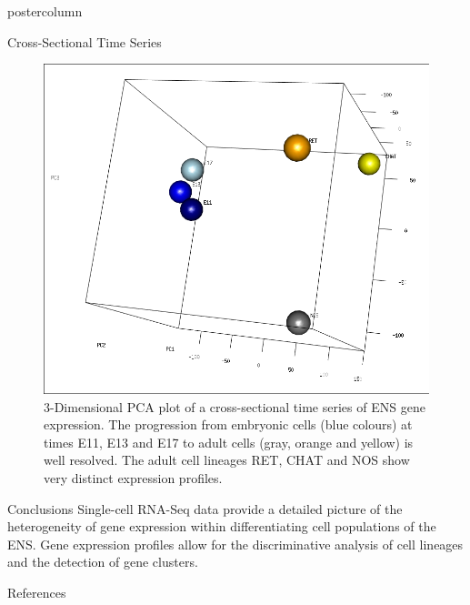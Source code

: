 \documentclass{beamer}
\begin{document}
\begin{frame}
\begin{columns}
\begin{column}{.45\textwidth}
\begin{beamercolorbox}[center]{postercolumn}
\begin{minipage}{.98\textwidth}
{\begin{myblock}{Cross-Sectional Time Series}
\begin{figure}
\begin{minipage}{1.0\textwidth}
	\centering\includegraphics[width=1.0\textwidth]{./time_series}
	\caption{3-Dimensional PCA plot of a cross-sectional time series of ENS
			gene expression. The progression from embryonic cells (blue colours)
			at times E11, E13 and E17 to adult cells (gray, orange and yellow)
			is well resolved. The adult cell lineages RET, CHAT and NOS
			show very distinct expression profiles.}
	\label{fig:timeseries}
\end{minipage}
\end{figure}
\end{myblock}\vfill
\begin{myblock}{Conclusions}
Single-cell RNA-Seq data provide a detailed picture of the heterogeneity of
gene expression within differentiating cell populations of the ENS.
Gene expression profiles allow for the discriminative analysis of cell lineages
and the detection of gene clusters. 
\end{myblock}\vfill
\begin{myblock}{References}
\footnotesize


\end{myblock}\vfill
}\end{minipage}
\end{beamercolorbox}
\end{column}
\end{columns}
\end{frame}
\end{document}
